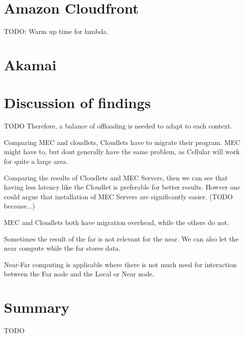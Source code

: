 \section{Amazon Cloudfront}
TODO: Warm up time for lambda.

\section{Akamai}


\section{Discussion of findings}
TODO
Therefore, a balance of offloading is needed to adapt to each context.
 
Comparing MEC and cloudlets, Cloudlets have to migrate their program. MEC might have to, but dont generally have the same problem, as Cellular will work for quite a large area.

Comparing the results of Cloudlets and MEC Servers, then we can see that having less latency like the Cloudlet is preferable for better results. Howver one could argue that installation of MEC Servers are significantly easier. (TODO because...)


MEC and Cloudlets both have migration overhead, while the others do not.

Sometimes the result of the far is not relevant for the near. We can also let the near compute while the far stores data.

Near-Far computing is applicable where there is not much need for interaction between the Far node and the Local or Near node.

\section{Summary}
TODO
